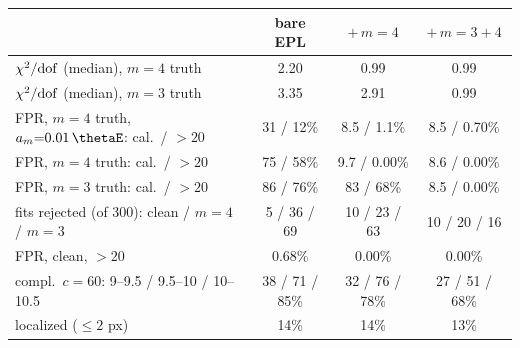 \begin{tabular}{@{}lccc@{}}
\toprule
 & bare EPL & $+\,m{=}4$ & $+\,m{=}3{+}4$ \\
\midrule
$\chi^2/{\rm dof}$ (median), $m{=}4$ truth & 2.20 & 0.99 & 0.99 \\
$\chi^2/{\rm dof}$ (median), $m{=}3$ truth & 3.35 & 2.91 & 0.99 \\
FPR, $m{=}4$ truth, $a_m{=}0.01\,\thetaE$: cal.\ / ${>}20$ & 31 / 12\% & 8.5 / 1.1\% & 8.5 / 0.70\% \\
FPR, $m{=}4$ truth: cal.\ / ${>}20$ & 75 / 58\% & 9.7 / 0.00\% & 8.6 / 0.00\% \\
FPR, $m{=}3$ truth: cal.\ / ${>}20$ & 86 / 76\% & 83 / 68\% & 8.5 / 0.00\% \\
fits rejected (of 300): clean / $m{=}4$ / $m{=}3$ & 5 / 36 / 69 & 10 / 23 / 63 & 10 / 20 / 16 \\
FPR, clean, ${>}20$ & 0.68\% & 0.00\% & 0.00\% \\
compl.\ $c{=}60$: 9--9.5 / 9.5--10 / 10--10.5 & 38 / 71 / 85\% & 32 / 76 / 78\% & 27 / 51 / 68\% \\
localized ($\le2$ px) & 14\% & 14\% & 13\% \\
\bottomrule
\end{tabular}

